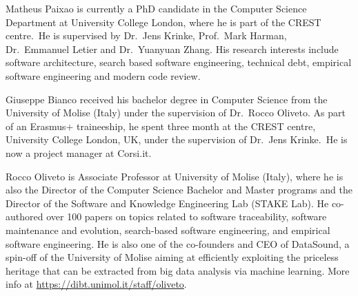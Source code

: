 \documentclass[10pt,journal,compsoc]{IEEEtran}
\begin{document}
\begin{IEEEbiography}{Matheus Paixao}
is currently a PhD candidate in the Computer Science Department at University College London, where he is part of the CREST centre.~He is supervised by Dr.~Jens Krinke, Prof.~Mark Harman, Dr.~Emmanuel Letier and Dr.~Yuanyuan Zhang.
His research interests include software architecture, search based software engineering, technical debt, empirical software engineering and modern code review.
\end{IEEEbiography}

\begin{IEEEbiography}{Giuseppe Bianco}
  received his bachelor degree in Computer Science from the University
  of Molise (Italy) under the supervision of Dr.~Rocco Oliveto. As
  part of an Erasmus+ traineeship, he spent three month at the
  CREST centre, University College London, UK, under the supervision
  of Dr.~Jens Krinke.~He is now a project manager at Corsi.it.
\end{IEEEbiography}

\begin{IEEEbiography}{Rocco Oliveto}
is Associate Professor at University of Molise (Italy), where he is
also the Director of the Computer Science Bachelor and Master programs
and the Director of the Software and Knowledge Engineering Lab (STAKE
Lab). He co-authored over 100 papers on topics related to software traceability, software maintenance and evolution, search-based software engineering, and empirical software engineering.
He is also one of the co-founders and CEO of DataSound, a spin-off of the University of Molise aiming at efficiently exploiting the priceless heritage that can be extracted from big data analysis via machine learning. 
More info at \url{https://dibt.unimol.it/staff/oliveto}.
\end{IEEEbiography}
\vfill
\end{document}
